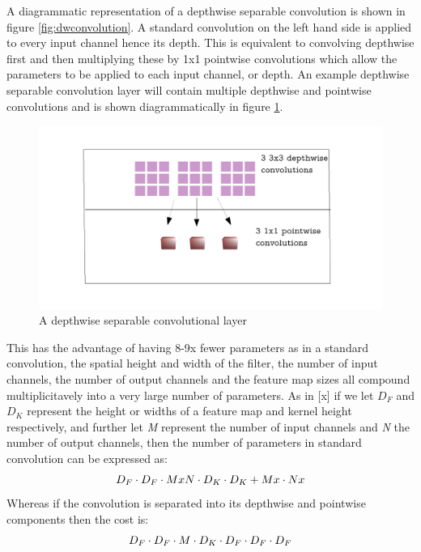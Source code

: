 \documentclass{article}
\begin{document}
A diagrammatic representation of a depthwise separable convolution is shown in figure \ref{fig:dwconvolution}. A standard convolution on the left hand side is applied to every input channel hence its depth. This is equivalent to convolving depthwise first and then multiplying these by 1x1 pointwise convolutions which allow the parameters to be applied to each input channel, or depth. An example depthwise separable convolution layer will contain multiple depthwise and pointwise convolutions and is shown diagrammatically in figure \ref{fig:dwconvolutionlayer}.\\

\begin{figure}[h]
  \includegraphics[width=\linewidth]{dwlayer.pdf}
  \caption{A depthwise separable convolutional layer}
  \label{fig:dwconvolutionlayer}
\end{figure}


This has the advantage of having 8-9x fewer parameters as in a standard convolution, the spatial height and width of the filter, the number of input channels, the number of output channels and the feature map sizes all compound multiplicitavely into a very large number of parameters. As in [x] if we let \emph{$D_{F}$} and \emph{$D_{K}$} represent the height or widths of a feature map and kernel height respectively, and further let \emph{M} represent the number of input channels and \emph{N} the number of output channels, then the number of parameters in standard convolution can be expressed as: \[\emph{$D_{F}$} \cdot \emph{$D_{F}$} \cdot M x N \cdot \emph{$D_{K}$} \cdot \emph{$D_{K}$} + M x \cdot N x \] Whereas if the convolution is separated into its depthwise and pointwise components then the cost is: \[\emph{$D_{F}$} \cdot \emph{$D_{F}$} \cdot M \cdot \emph{$D_{K}$} \cdot \emph{$D_{F}$} \cdot \emph{$D_{F}$} \cdot \emph{$D_{F}$}\]\\
\end{document}
